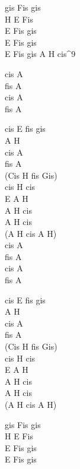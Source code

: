 \begin{chordw}
    gis Fis gis\\
    H E Fis\\
    E Fis gis\\
    E Fis gis\\
    E Fis gis A H cis^9

    cis A\\
    fis A\\
    cis A\\
    fis A

    cis E fis gis\\
    A H\\
    cis A\\
    fis A\\
    (Cis H fis Gis)\\
    cis H cis\\
    E A H\\
    A H cis\\
    A H cis\\
    (A H cis A H)\\
    cis A\\
    fis A\\
    cis A\\
    fis A

    cis E fis gis\\
    A H\\
    cis A\\
    fis A\\
    (Cis H fis Gis)\\
    cis H cis\\
    E A H\\
    A H cis\\
    A H cis\\
    (A H cis A H)

    gis Fis gis\\
    H E Fis\\
    E Fis gis\\
    E Fis gis\\
\end{chordw}